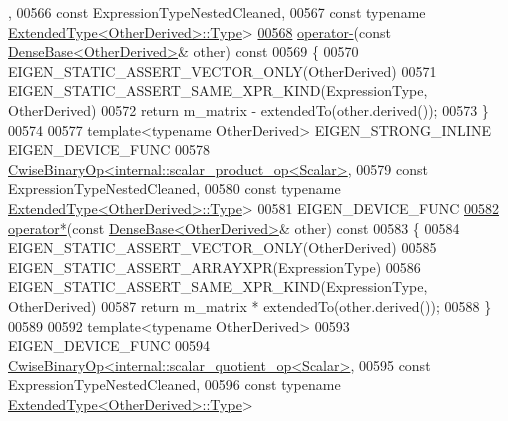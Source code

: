 \begin{DoxyCode}
      ,
00566                   \textcolor{keyword}{const} ExpressionTypeNestedCleaned,
00567                   \textcolor{keyword}{const} \textcolor{keyword}{typename} \hyperlink{group___core___module_class_eigen_1_1_replicate}{ExtendedType<OtherDerived>::Type}>
\hyperlink{group___core___module_a5aced68defd8d0fd08829386b6c285fb}{00568}     \hyperlink{group___core___module_a5aced68defd8d0fd08829386b6c285fb}{operator-}(\textcolor{keyword}{const} \hyperlink{group___core___module_class_eigen_1_1_dense_base}{DenseBase<OtherDerived>}& other)\textcolor{keyword}{ const}
00569 \textcolor{keyword}{    }\{
00570       EIGEN\_STATIC\_ASSERT\_VECTOR\_ONLY(OtherDerived)
00571       EIGEN\_STATIC\_ASSERT\_SAME\_XPR\_KIND(ExpressionType, OtherDerived)
00572       \textcolor{keywordflow}{return} m\_matrix - extendedTo(other.derived());
00573     \}
00574 
00577     \textcolor{keyword}{template}<\textcolor{keyword}{typename} OtherDerived> EIGEN\_STRONG\_INLINE EIGEN\_DEVICE\_FUNC
00578     \hyperlink{group___core___module_class_eigen_1_1_cwise_binary_op}{CwiseBinaryOp<internal::scalar\_product\_op<Scalar>},
00579                   \textcolor{keyword}{const} ExpressionTypeNestedCleaned,
00580                   \textcolor{keyword}{const} \textcolor{keyword}{typename} \hyperlink{group___core___module_class_eigen_1_1_replicate}{ExtendedType<OtherDerived>::Type}>
00581     EIGEN\_DEVICE\_FUNC
\hyperlink{group___core___module_ab416470ff03705428a5f6f633f815415}{00582}     \hyperlink{group___core___module_ab416470ff03705428a5f6f633f815415}{operator*}(\textcolor{keyword}{const} \hyperlink{group___core___module_class_eigen_1_1_dense_base}{DenseBase<OtherDerived>}& other)\textcolor{keyword}{ const}
00583 \textcolor{keyword}{    }\{
00584       EIGEN\_STATIC\_ASSERT\_VECTOR\_ONLY(OtherDerived)
00585       EIGEN\_STATIC\_ASSERT\_ARRAYXPR(ExpressionType)
00586       EIGEN\_STATIC\_ASSERT\_SAME\_XPR\_KIND(ExpressionType, OtherDerived)
00587       \textcolor{keywordflow}{return} m\_matrix * extendedTo(other.derived());
00588     \}
00589 
00592     \textcolor{keyword}{template}<\textcolor{keyword}{typename} OtherDerived>
00593     EIGEN\_DEVICE\_FUNC
00594     \hyperlink{group___core___module_class_eigen_1_1_cwise_binary_op}{CwiseBinaryOp<internal::scalar\_quotient\_op<Scalar>},
00595                   \textcolor{keyword}{const} ExpressionTypeNestedCleaned,
00596                   \textcolor{keyword}{const} \textcolor{keyword}{typename} \hyperlink{group___core___module_class_eigen_1_1_replicate}{ExtendedType<OtherDerived>::Type}>

\end{DoxyCode}

